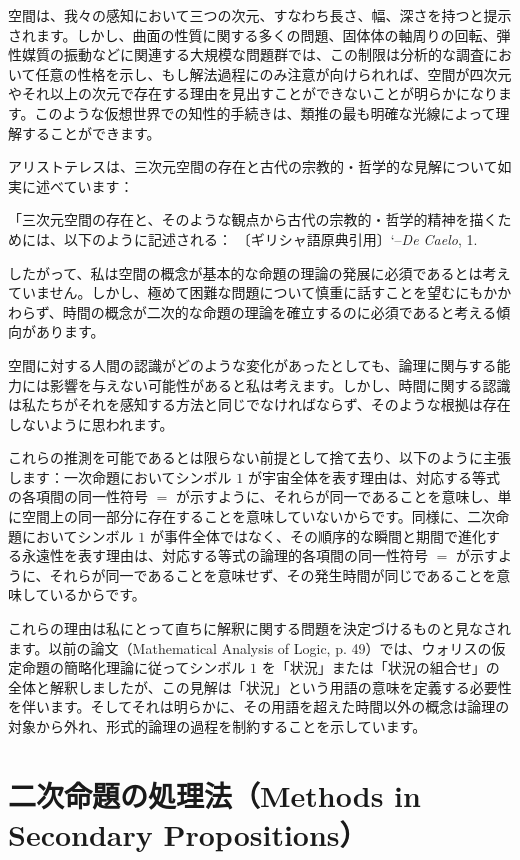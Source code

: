 \documentclass[a4paper,11pt,openany]{ltjsbook}
\begin{document}
空間は、我々の感知において三つの次元、すなわち長さ、幅、深さを持つと提示されます。しかし、曲面の性質に関する多くの問題、固体体の軸周りの回転、弾性媒質の振動などに関連する大規模な問題群では、この制限は分析的な調査において任意の性格を示し、もし解法過程にのみ注意が向けられれば、空間が四次元やそれ以上の次元で存在する理由を見出すことができないことが明らかになります。このような仮想世界での知性的手続きは、類推の最も明確な光線によって理解することができます。

アリストテレスは、三次元空間の存在と古代の宗教的・哲学的な見解について如実に述べています：

「三次元空間の存在と、そのような観点から古代の宗教的・哲学的精神を描くためには、以下のように記述される：
〔ギリシャ語原典引用〕`--\textit{De Caelo}, 1.

したがって、私は空間の概念が基本的な命題の理論の発展に必須であるとは考えていません。しかし、極めて困難な問題について慎重に話すことを望むにもかかわらず、時間の概念が二次的な命題の理論を確立するのに必須であると考える傾向があります。

空間に対する人間の認識がどのような変化があったとしても、論理に関与する能力には影響を与えない可能性があると私は考えます。しかし、時間に関する認識は私たちがそれを感知する方法と同じでなければならず、そのような根拠は存在しないように思われます。

これらの推測を可能であるとは限らない前提として捨て去り、以下のように主張します：一次命題においてシンボル $1$ が宇宙全体を表す理由は、対応する等式の各項間の同一性符号 $=$ が示すように、それらが同一であることを意味し、単に空間上の同一部分に存在することを意味していないからです。同様に、二次命題においてシンボル $1$ が事件全体ではなく、その順序的な瞬間と期間で進化する永遠性を表す理由は、対応する等式の論理的各項間の同一性符号 $=$ が示すように、それらが同一であることを意味せず、その発生時間が同じであることを意味しているからです。

これらの理由は私にとって直ちに解釈に関する問題を決定づけるものと見なされます。以前の論文（Mathematical Analysis of Logic, p. 49）では、ウォリスの仮定命題の簡略化理論に従ってシンボル $1$ を「状況」または「状況の組合せ」の全体と解釈しましたが、この見解は「状況」という用語の意味を定義する必要性を伴います。そしてそれは明らかに、その用語を超えた時間以外の概念は論理の対象から外れ、形式的論理の過程を制約することを示しています。

\newpage

\chapter{二次命題の処理法（Methods in Secondary Propositions）}
\label{ch:xii}
\end{document}
